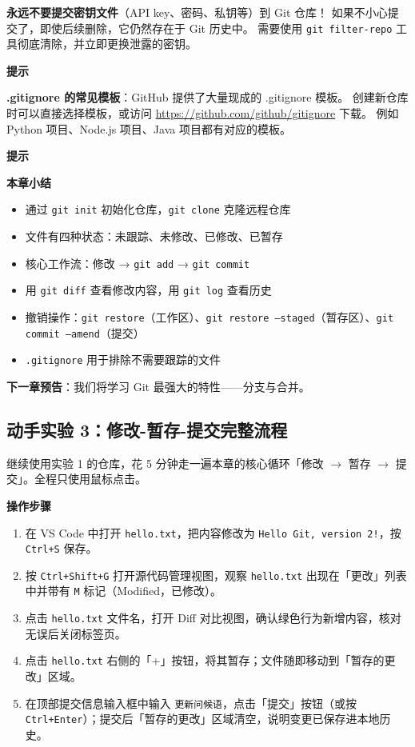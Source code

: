 \documentclass[12pt,a4paper,openany]{ctexbook}
\newenvironment{tipbox}{%
  \medskip
  \noindent\textbf{\faLightbulb\; 提示}
  \smallskip
}{%
  \medskip
}
\newenvironment{stepbox}{%
  \medskip
  \noindent\textbf{\faCogs\; 操作步骤}
  \smallskip
}{%
  \medskip
}
\begin{document}
\begin{warnbox}
\textbf{永远不要提交密钥文件}（API key、密码、私钥等）到 Git 仓库！
如果不小心提交了，即使后续删除，它仍然存在于 Git 历史中。
需要使用 \texttt{git filter-repo} 工具彻底清除，并立即更换泄露的密钥。
\end{warnbox}

\begin{tipbox}
\textbf{.gitignore 的常见模板}：GitHub 提供了大量现成的 .gitignore 模板。
创建新仓库时可以直接选择模板，或访问 \url{https://github.com/github/gitignore} 下载。
例如 Python 项目、Node.js 项目、Java 项目都有对应的模板。
\end{tipbox}

\begin{tipbox}
\textbf{本章小结}
\begin{itemize}
  \item 通过 \texttt{git init} 初始化仓库，\texttt{git clone} 克隆远程仓库
  \item 文件有四种状态：未跟踪、未修改、已修改、已暂存
  \item 核心工作流：修改 → \texttt{git add} → \texttt{git commit}
  \item 用 \texttt{git diff} 查看修改内容，用 \texttt{git log} 查看历史
  \item 撤销操作：\texttt{git restore}（工作区）、\texttt{git restore --staged}（暂存区）、\texttt{git commit --amend}（提交）
  \item \texttt{.gitignore} 用于排除不需要跟踪的文件
\end{itemize}

\textbf{下一章预告}：我们将学习 Git 最强大的特性——分支与合并。
\end{tipbox}

\subsection*{动手实验 3：修改-暂存-提交完整流程}

继续使用实验 1 的仓库，花 5 分钟走一遍本章的核心循环「修改 $\to$ 暂存 $\to$ 提交」。全程只使用鼠标点击。

\begin{stepbox}
\begin{enumerate}[leftmargin=1.5em]
  \item 在 VS Code 中打开 \texttt{hello.txt}，把内容修改为 \texttt{Hello Git, version 2!}，按 \texttt{Ctrl+S} 保存。
  \item 按 \texttt{Ctrl+Shift+G} 打开源代码管理视图，观察 \texttt{hello.txt} 出现在「更改」列表中并带有 \texttt{M} 标记（Modified，已修改）。
  \item 点击 \texttt{hello.txt} 文件名，打开 Diff 对比视图，确认绿色行为新增内容，核对无误后关闭标签页。
  \item 点击 \texttt{hello.txt} 右侧的「+」按钮，将其暂存；文件随即移动到「暂存的更改」区域。
  \item 在顶部提交信息输入框中输入 \texttt{更新问候语}，点击「提交」按钮（或按 \texttt{Ctrl+Enter}）；提交后「暂存的更改」区域清空，说明变更已保存进本地历史。
\end{enumerate}
\end{stepbox}
\end{document}
